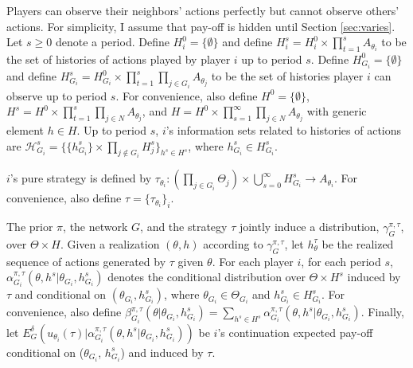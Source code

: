 \documentclass[12pt,letterpaper]{article}
\theoremstyle{definition}
\theoremstyle{remark}
\theoremstyle{claim}
\begin{document}
Players can observe their neighbors' actions perfectly but cannot observe others' actions. For simplicity, I assume that pay-off is hidden until Section \ref{sec:varies}. Let $s\geq 0$ denote a period. Define $H^0_{i}=\{ \emptyset \}$ and define $H^s_{i}=H^0_{i}\times \prod^s_{t=1}A_{\theta_i}$ to be the set of histories of actions played by player $i$ up to period $s$. Define $H^0_{G_i}=\{\emptyset\}$ and define $H^s_{G_i}=H^0_{G_i}\times \prod^s_{t=1}\prod_{j\in G_i}A_{\theta_j}$ to be the set of histories player $i$ can observe up to period $s$.  For convenience, also define $H^0=\{\emptyset\}$, $H^s=H^0\times \prod^s_{t=1}\prod_{j\in N}A_{\theta_j}$, and $H=H^0\times \prod^{\infty}_{s=1}\prod_{j\in N}A_{\theta_j}$ with generic element $h\in H$. Up to period $s$, $i$'s information sets related to histories of actions are $\mathcal{H}^s_{G_i}=\{\{h^s_{G_i}\}\times \prod_{j\notin G_i}H^s_{j}\}_{h^s\in H^s}$, where $h^s_{G_i}\in H^s_{G_i}$.

$i$'s pure strategy is defined by $\tau_{\theta_i}:(\prod_{j\in G_i}\Theta_j)\times \bigcup^{\infty}_{s=0}H^s_{G_i}\rightarrow A_{\theta_i}$. For convenience, also define $\tau=\{\tau_{\theta_i}\}_i$. 
 
The prior $\pi$, the network $G$, and the strategy $\tau$ jointly induce a distribution, $\gamma^{\pi,\tau}_G$, over $\Theta\times H$. Given a realization $(\theta,h)$ according to $\gamma^{\pi,\tau}_G$, let $h^{\tau}_\theta$ be the realized sequence of actions generated by $\tau$ given $\theta$. 
For each player $i$,  for each period $s$, $\alpha^{\pi,\tau}_{G_i}(\theta, h^{s}|\theta_{G_i},h^{s}_{G_i})$ denotes the conditional distribution over $\Theta\times H^s$ induced by $\tau$ and conditional on $(\theta_{G_i}, h^{s}_{G_i} )$, where $\theta_{G_i}\in \Theta_{G_i}$ and $h^{s}_{G_i}\in H^s_{G_i}$. For convenience, also define $\beta^{\pi,\tau}_{G_i}(\theta|\theta_{G_i},h^{s}_{G_i})=\sum_{h^{s}\in H^s}\alpha^{\pi,\tau}_{G_i}(\theta, h^{s}|\theta_{G_i},h^{s}_{G_i})$.
Finally, let
$E^{\delta}_G(u_{\theta_i}(\tau)|\alpha^{\pi,\tau}_{G_i}(\theta, h^{s}|\theta_{G_i},h^{s}_{G_i}))$
be $i$'s continuation expected pay-off conditional on ($\theta_{G_i}$, $h^{s}_{G_i}$) and induced by $\tau$. 
\end{document}
